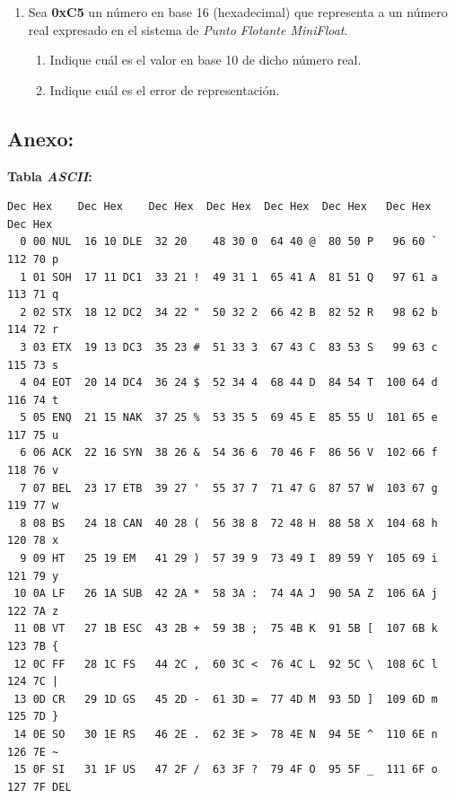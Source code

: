 \documentclass[12pt]{article}
\begin{document}
\begin{enumerate}
\begin{enumerate}
        \end{enumerate}

    \item Sea \textbf{0xC5} un número en base 16 (hexadecimal) que
        representa a un número real expresado en el sistema de \emph{Punto
        Flotante MiniFloat}.

        \begin{enumerate}

            \item Indique cuál es el valor en base 10 de dicho número real.

            \item Indique cuál es el error de representación.

        \end{enumerate}


\end{enumerate}

\subsection*{ \large\textbf{Anexo:} }

\textbf{Tabla \emph{ASCII}:}

\begin{verbatim}
Dec Hex    Dec Hex    Dec Hex  Dec Hex  Dec Hex  Dec Hex   Dec Hex   Dec Hex
  0 00 NUL  16 10 DLE  32 20    48 30 0  64 40 @  80 50 P   96 60 `  112 70 p
  1 01 SOH  17 11 DC1  33 21 !  49 31 1  65 41 A  81 51 Q   97 61 a  113 71 q
  2 02 STX  18 12 DC2  34 22 "  50 32 2  66 42 B  82 52 R   98 62 b  114 72 r
  3 03 ETX  19 13 DC3  35 23 #  51 33 3  67 43 C  83 53 S   99 63 c  115 73 s
  4 04 EOT  20 14 DC4  36 24 $  52 34 4  68 44 D  84 54 T  100 64 d  116 74 t
  5 05 ENQ  21 15 NAK  37 25 %  53 35 5  69 45 E  85 55 U  101 65 e  117 75 u
  6 06 ACK  22 16 SYN  38 26 &  54 36 6  70 46 F  86 56 V  102 66 f  118 76 v
  7 07 BEL  23 17 ETB  39 27 '  55 37 7  71 47 G  87 57 W  103 67 g  119 77 w
  8 08 BS   24 18 CAN  40 28 (  56 38 8  72 48 H  88 58 X  104 68 h  120 78 x
  9 09 HT   25 19 EM   41 29 )  57 39 9  73 49 I  89 59 Y  105 69 i  121 79 y
 10 0A LF   26 1A SUB  42 2A *  58 3A :  74 4A J  90 5A Z  106 6A j  122 7A z
 11 0B VT   27 1B ESC  43 2B +  59 3B ;  75 4B K  91 5B [  107 6B k  123 7B {
 12 0C FF   28 1C FS   44 2C ,  60 3C <  76 4C L  92 5C \  108 6C l  124 7C |
 13 0D CR   29 1D GS   45 2D -  61 3D =  77 4D M  93 5D ]  109 6D m  125 7D }
 14 0E SO   30 1E RS   46 2E .  62 3E >  78 4E N  94 5E ^  110 6E n  126 7E ~
 15 0F SI   31 1F US   47 2F /  63 3F ?  79 4F O  95 5F _  111 6F o  127 7F DEL
\end{verbatim}
\end{document}

